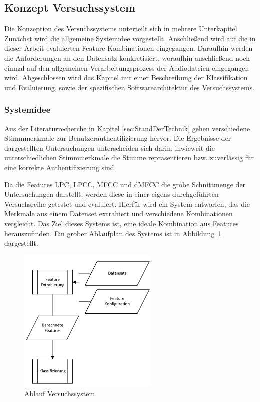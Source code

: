 \subsection{Konzept Versuchssystem}\label{sec:KonzeptVersuchssystem}
Die Konzeption des Versuchssystems unterteilt sich in mehrere Unterkapitel.
Zunächst wird die allgemeine Systemidee vorgestellt.
Anschließend wird auf die in dieser Arbeit evaluierten Feature Kombinationen eingegangen.
Daraufhin werden die Anforderungen an den Datensatz konkretisiert, woraufhin anschließend noch einmal auf den allgemeinen Verarbeitungsprozess der Audiodateien eingegangen wird.
Abgeschlossen wird das Kapitel mit einer Beschreibung der Klassifikation und Evaluierung, sowie der spezifischen Softwarearchitektur des Versuchssystems.

\subsubsection{Systemidee}

Aus der Literaturrecherche in Kapitel \ref{sec:StandDerTechnik} gehen verschiedene Stimmmerkmale zur Benutzerauthentifizierung hervor.
Die Ergebnisse der dargestellten Untersuchungen unterscheiden sich darin, inwieweit die unterschiedlichen Stimmmerkmale die Stimme repräsentieren bzw. zuverlässig für eine korrekte Authentifizierung sind.

Da die Features \ac{LPC}, \ac{LPCC}, \ac{MFCC} und \ac{dMFCC} die grobe Schnittmenge der Untersuchungen darstellt, werden diese in einer eigens durchgeführten Versuchsreihe getestet und evaluiert.
Hierfür wird ein System entworfen, das die Merkmale aus einem Datenset extrahiert und verschiedene Kombinationen vergleicht.
Das Ziel dieses Systems ist, eine ideale Kombination aus Features herauszufinden.
Ein grober Ablaufplan des Systems ist in Abbildung~\ref{fig:PAP_DemoSystem} dargestellt.
\begin{figure}[H]
    \centering
    \includegraphics[width=0.6\textwidth, keepaspectratio]{images/PAP_Demosystem.pdf}
    \caption{Ablauf Versuchssystem}
    \label{fig:PAP_DemoSystem}
\end{figure}

